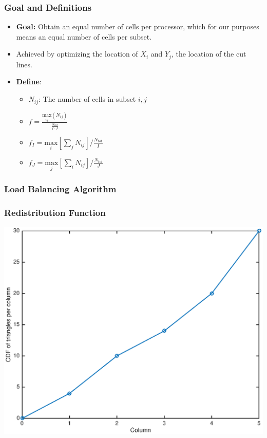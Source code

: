 \documentclass[]{beamer}
\begin{document}
\begin{frame}[t]\frametitle{ Goal and Definitions}
	\begin{block}{}
	
		\begin{itemize}
			\item \textbf{Goal:} Obtain an equal number of cells per processor, which for our purposes means an equal number of cells per subset.
			\item Achieved by optimizing the location of $X_i$ and $Y_j$, the location of the cut lines.
			\item \textbf{Define}:
			\begin{itemize}
			\item $N_{ij}$: The number of cells  in subset ${i,j}$
			\item $f =\frac{\underset{ij}{\text{max}}(N_{ij})}{\frac{N_{tot}}{I\cdot J}}$
			\item $f_I = \underset{i}{\text{max}}[\sum_{j} N_{ij}]/\frac{N_{tot}}{I}$
			\item $f_J = \underset{j}{\text{max}}[\sum_{i} N_{ij}]/\frac{N_{tot}}{J}$
			\end{itemize}
		\end{itemize}
	\end{block}
\end{frame}

\begin{frame}[t]\frametitle{Load Balancing Algorithm}
\vspace{-0.5 cm}
\begin{block}{}

\end{block}
\end{frame}

\begin{frame}[t]\frametitle{Redistribution Function}
\centering
\includegraphics[scale = 0.5]{figures/before_redistribute.eps}
\end{frame}
\end{document}
